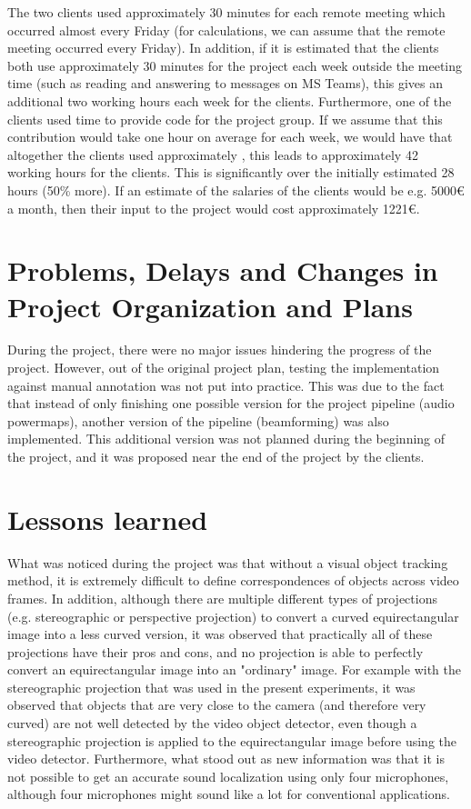 The two clients used approximately 30 minutes for each remote meeting which occurred almost every Friday (for calculations, we can assume that the remote meeting occurred every Friday). In addition, if it is estimated that the clients both use approximately 30 minutes for the project each week outside the meeting time (such as reading and answering to messages on MS Teams), this gives an additional two working hours each week for the clients. Furthermore, one of the clients used time to provide code for the project group. If we assume that this contribution would take one hour on average for each week, we would have that altogether the clients used approximately , this leads to approximately 42 working hours for the clients. This is significantly over the initially estimated 28 hours (50\% more). If an estimate of the salaries of the clients would be e.g. 5000{\euro} a month, then their input to the project would cost approximately 1221{\euro}.

\section{Problems, Delays and Changes in Project Organization and Plans}

During the project, there were no major issues hindering the progress of the project. However, out of the original project plan, testing the implementation against manual annotation was not put into practice. This was due to the fact that instead of only finishing one possible version for the project pipeline (audio powermaps), another version of the pipeline (beamforming) was also implemented. This additional version was not planned during the beginning of the project, and it was proposed near the end of the project by the clients.

\section{Lessons learned}

What was noticed during the project was that without a visual object tracking method, it is extremely difficult to define correspondences of objects across video frames. In addition, although there are multiple different types of projections (e.g. stereographic or perspective projection) to convert a curved equirectangular image into a less curved version, it was observed that practically all of these projections have their pros and cons, and no projection is able to perfectly convert an equirectangular image into an "ordinary" image. For example with the stereographic projection that was used in the present experiments, it was observed that objects that are very close to the camera (and therefore very curved) are not well detected by the video object detector, even though a stereographic projection is applied to the equirectangular image before using the video detector. Furthermore, what stood out as new information was that it is not possible to get an accurate sound localization using only four microphones, although four microphones might sound like a lot for conventional applications.

